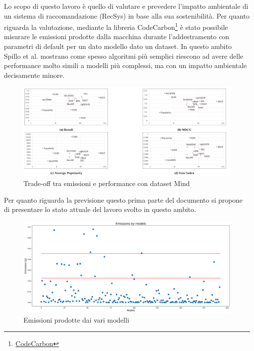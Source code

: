 \noindent Lo scopo di questo lavoro è quello di valutare e prevedere l'impatto ambientale di un sistema di raccomandazione (RecSys) in base alla sua sostenibilità. Per quanto riguarda la valutazione, mediante la libreria CodeCarbon\footnote{\href{http://codecarbon.io}{CodeCarbon}}{} è stato possibile misurare le emissioni prodotte dalla macchina durante l'addestramento con parametri di default per un dato modello dato un dataset. 
In questo ambito  Spillo et al.\cite{spillo2023towards} mostrano come spesso algoritmi più semplici riescono ad avere delle performance molto simili a modelli più complessi, ma con un impatto ambientale decisamente minore.
\begin{figure}[H]
    \centering
    \includegraphics[scale=0.75]{images/risultati-valutazione.png}
    \caption{Trade-off tra emissioni e performance con dataset Mind}


\end{figure}
\noindent Per quanto riguarda la previsione questo prima parte del documento si propone di presentare lo stato attuale del lavoro svolto in questo ambito.
\begin{figure}[H]
    \centering
    \includegraphics[scale=0.25]{images/situazione-attuale.png}
    \caption{Emissioni prodotte dai vari modelli}
\end{figure}

